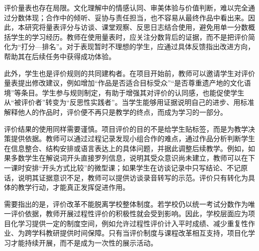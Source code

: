 评价量表也存在局限。文化理解中的情感认同、审美体验与价值判断，难以完全通过分数体现；合作中的倾听、妥协与责任担当，也不容易从最终作品中看出来。因此，本研究将量表评分与访谈、课堂观察、反思日志结合使用，避免用单一分数概括学生的学习经历。教师在使用量表时，应关注分数背后的证据，而不是把评价简化为“打分—排名”。对于表现暂时不理想的学生，应通过具体反馈指出改进方向，帮助其在后续任务中获得成功体验。

此外，学生也是评价规则的共同建构者。在项目开始前，教师可以邀请学生对评价量表提出修改建议，例如增加“作品是否适合目标受众”“是否尊重遗产地的文化语境”等条目。学生参与规则制定，有助于增强其对评价的认同感，也能促使学生从“被评价者”转变为“反思性实践者”。当学生能够用证据说明自己的进步、用标准解释他人的作品时，评价便不再只是教学的终点，而成为学习的一部分。

评价结果的使用同样需要谨慎。项目评价的目的不是给学生贴标签，而是为教学决策提供依据。教师可以通过过程记录发现小组合作的难点，通过作品分析判断学生在信息整合、结构安排或语言表达上的具体问题，并据此调整后续教学。例如，如果多数学生在解说词开头直接罗列信息，说明其受众意识尚未建立，教师可以在下一课时安排“开头方式比较”的微型课；如果学生在访谈记录中只写结论、不记原话，说明其证据意识不足，教师可以提供访谈录音转写的示范。评价只有转化为具体的教学行动，才能真正发挥促进作用。

需要指出的是，评价改革不能脱离学校整体制度。若学校仍以统一考试分数作为唯一评价依据，教师开展过程性评价的积极性就会受到影响。因此，学校层面应为项目化学习提供一定的制度空间，例如允许过程性评价计入平时成绩、减少重复性作业、为跨学科教研提供时间保障。只有当评价制度与课程改革相互支持，项目化学习才能持续开展，而不是成为一次性的展示活动。
